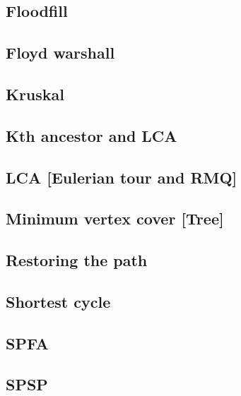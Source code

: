 \subsection{Floodfill}
\raggedbottom
\hrulefill
\subsection{Floyd warshall}
\raggedbottom
\hrulefill
\subsection{Kruskal}
\raggedbottom
\hrulefill
\subsection{Kth ancestor and LCA}
\raggedbottom
\hrulefill
\subsection{LCA [Eulerian tour and RMQ]}
\raggedbottom
\hrulefill
\subsection{Minimum vertex cover [Tree]}
\raggedbottom
\hrulefill
\subsection{Restoring the path}
\raggedbottom
\hrulefill
\subsection{Shortest cycle}
\raggedbottom
\hrulefill
\subsection{SPFA}
\raggedbottom
\hrulefill
\subsection{SPSP}
\raggedbottom
\hrulefill
